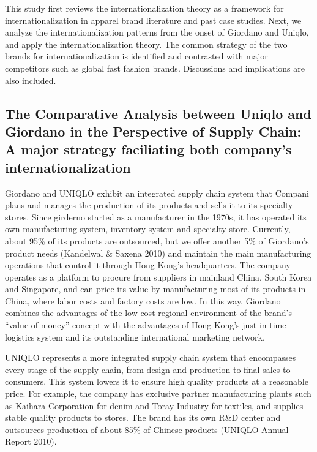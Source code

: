 \documentclass[12pt,]{article}
\begin{document}
This study first reviews the internationalization theory as a framework
for internationalization in apparel brand literature and past case
studies. Next, we analyze the internationalization patterns from the
onset of Giordano and Uniqlo, and apply the internationalization theory.
The common strategy of the two brands for internationalization is
identified and contrasted with major competitors such as global fast
fashion brands. Discussions and implications are also included.

\hypertarget{the-comparative-analysis-between-uniqlo-and-giordano-in-the-perspective-of-supply-chain-a-major-strategy-faciliating-both-companys-internationalization}{%
\subsection{The Comparative Analysis between Uniqlo and Giordano in the
Perspective of Supply Chain: A major strategy faciliating both company's
internationalization}\label{the-comparative-analysis-between-uniqlo-and-giordano-in-the-perspective-of-supply-chain-a-major-strategy-faciliating-both-companys-internationalization}}

Giordano and UNIQLO exhibit an integrated supply chain system that
Compani plans and manages the production of its products and sells it to
its specialty stores. Since girderno started as a manufacturer in the
1970s, it has operated its own manufacturing system, inventory system
and specialty store. Currently, about 95\% of its products are
outsourced, but we offer another 5\% of Giordano's product needs
(Kandelwal \& Saxena 2010) and maintain the main manufacturing
operations that control it through Hong Kong's headquarters. The company
operates as a platform to procure from suppliers in mainland China,
South Korea and Singapore, and can price its value by manufacturing most
of its products in China, where labor costs and factory costs are low.
In this way, Giordano combines the advantages of the low-cost regional
environment of the brand's ``value of money'' concept with the
advantages of Hong Kong's just-in-time logistics system and its
outstanding international marketing network.

UNIQLO represents a more integrated supply chain system that encompasses
every stage of the supply chain, from design and production to final
sales to consumers. This system lowers it to ensure high quality
products at a reasonable price. For example, the company has exclusive
partner manufacturing plants such as Kaihara Corporation for denim and
Toray Industry for textiles, and supplies stable quality products to
stores. The brand has its own R\&D center and outsources production of
about 85\% of Chinese products (UNIQLO Annual Report 2010).
\end{document}

